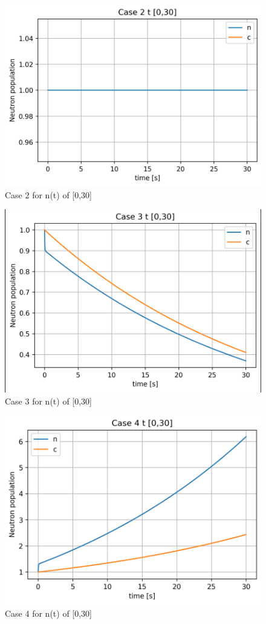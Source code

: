 \documentclass[12pt,fleqn, parskip=full]{scrartcl}
\begin{document}
\begin{figure}[H]
	\centering
	\includegraphics[scale=1]{Image_2_hw_4}
	\caption{Case 2 for n(t) of [0,30]}
\end{figure}

\begin{figure}[H]
	\centering
	\includegraphics[scale=1]{Image_3_hw_4}
	\caption{Case 3 for n(t) of [0,30]}
\end{figure}

\begin{figure}[H]
	\centering
	\includegraphics[scale=1]{Image_4_hw_4}
	\caption{Case 4 for n(t) of [0,30]}
\end{figure}
\end{document}
